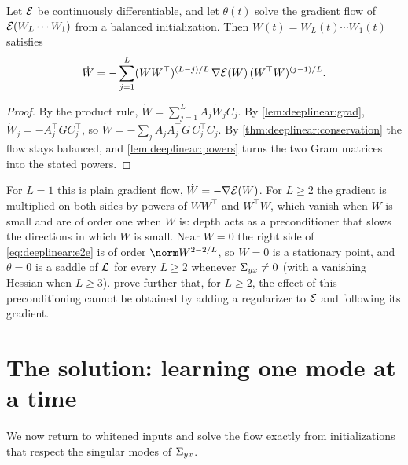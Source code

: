 \begin{refsection}
\begin{theorem}\label{thm:deeplinear:e2e}
Let $\mathcal{E}$ be continuously differentiable, and let $\theta(t)$ solve the gradient flow of $\mathcal{E}(W_L\cdots W_1)$ from a balanced initialization. Then $W(t)=W_L(t)\cdots W_1(t)$ satisfies
\begin{equation}\label{eq:deeplinear:e2e}
  \dot W=-\sum_{j=1}^L(WW^\top)^{(L-j)/L}\,\nabla\mathcal{E}(W)\,(W^\top W)^{(j-1)/L} .
\end{equation}
\end{theorem}

\begin{proof}
By the product rule, $\dot W=\sum_{j=1}^LA_j\dot W_jC_j$. By \cref{lem:deeplinear:grad}, $\dot W_j=-A_j^\top GC_j^\top$, so $\dot W=-\sum_jA_jA_j^\top G\,C_j^\top C_j$. By \cref{thm:deeplinear:conservation} the flow stays balanced, and \cref{lem:deeplinear:powers} turns the two Gram matrices into the stated powers.
\end{proof}

For $L=1$ this is plain gradient flow, $\dot W=-\nabla\mathcal{E}(W)$. For $L\ge2$ the gradient is multiplied on both sides by powers of $WW^\top$ and $W^\top W$, which vanish when $W$ is small and are of order one when $W$ is: depth acts as a preconditioner that slows the directions in which $W$ is small. Near $W=0$ the right side of \eqref{eq:deeplinear:e2e} is of order $\norm W^{2-2/L}$, so $W=0$ is a stationary point, and $\theta=0$ is a saddle of $\mathcal{L}$ for every $L\ge2$ whenever $\Sigma_{yx}\ne0$ (with a vanishing Hessian when $L\ge3$). \Textcite{AroraCohenHazan2018} prove further that, for $L\ge2$, the effect of this preconditioning cannot be obtained by adding a regularizer to $\mathcal{E}$ and following its gradient.

\section{The solution: learning one mode at a time}\label{sec:deeplinear:modes}

We now return to whitened inputs and solve the flow exactly from initializations that respect the singular modes of $\Sigma_{yx}$.



\end{refsection}
